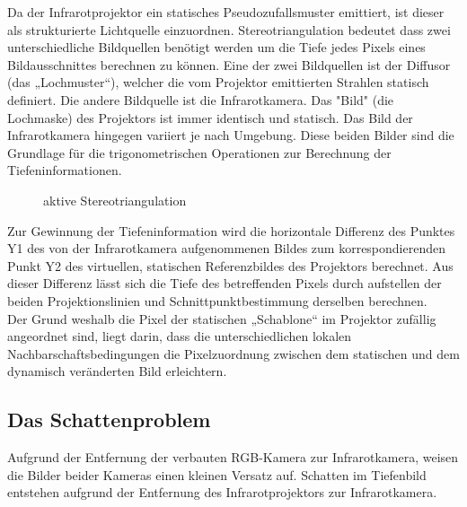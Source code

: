 Da der Infrarotprojektor ein statisches Pseudozufallsmuster emittiert, ist dieser als strukturierte Lichtquelle einzuordnen.
Stereotriangulation bedeutet dass zwei unterschiedliche Bildquellen benötigt werden um die Tiefe jedes Pixels eines Bildausschnittes berechnen zu können.
Eine der zwei Bildquellen ist der Diffusor (das „Lochmuster“), welcher die vom Projektor emittierten Strahlen statisch definiert. Die andere Bildquelle ist die Infrarotkamera.
Das "Bild" (die Lochmaske) des Projektors ist immer identisch und statisch. Das Bild der Infrarotkamera hingegen variiert je nach Umgebung. Diese beiden Bilder sind die Grundlage für die trigonometrischen Operationen zur Berechnung der Tiefeninformationen.

\begin{figure}[!ht]
  \centering
   \caption{ aktive Stereotriangulation }
\end{figure}
Zur Gewinnung der Tiefeninformation wird die horizontale Differenz des Punktes Y1 des von der Infrarotkamera aufgenommenen Bildes zum korrespondierenden Punkt Y2 des virtuellen, statischen Referenzbildes des Projektors berechnet. Aus dieser Differenz lässt sich die Tiefe des betreffenden Pixels durch aufstellen der beiden Projektionslinien und Schnittpunktbestimmung derselben berechnen. \\
Der Grund weshalb die Pixel der statischen „Schablone“ im Projektor zufällig angeordnet sind, liegt darin, dass die unterschiedlichen lokalen Nachbarschaftsbedingungen die Pixelzuordnung zwischen dem statischen und dem dynamisch veränderten Bild erleichtern.


\subsection{Das Schattenproblem}

Aufgrund der Entfernung der verbauten RGB-Kamera zur Infrarotkamera, weisen die Bilder beider Kameras einen kleinen Versatz auf.
Schatten im Tiefenbild entstehen aufgrund der Entfernung des Infrarotprojektors zur Infrarotkamera.


